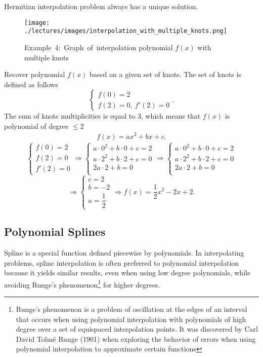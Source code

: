 \begin{proposition}{}{}
    Hermitian interpolation problem always has a unique solution.
\end{proposition}
\begin{wrapfigure}[15]{r}{0.32\columnwidth}
    \texttt{[image: ./lectures/images/interpolation\_with\_multiple\_knots.png]}
    \caption*{Example~4:~Graph~of~interpolation polynomial
    $f(x)$ with multiple knots}
\end{wrapfigure}
\Ex 
Recover polynomial $f(x)$ based on a given set of knots. The set of knots is defined as follows
$$
\left\{ 
\begin{array}{l}         
    f(0) = 2\\
    f(2) = 0, \ f'(2)=0
\end{array}
\right..
$$
The sum of knots multiplicities is equal to 3, which means that $f(x)$ is polynomial of degree $\leq 2$
\[
    \begin{array}{c}
        f(x) = ax^2 + bx + c.
    \end{array}  
\]
$$
\left\{ 
\begin{array}{l}         
    f(0) = 2\\
    f(2) = 0\\ 
    f'(2)=0
\end{array}
\right.
\Rightarrow
\left\{ 
\begin{array}{l}         
    a \cdot 0^2 + b\cdot0 + c = 2\\
    a \cdot 2^2 + b\cdot2 + c = 0\\
    2a \cdot 2 + b = 0\\
\end{array}
\right.
\Rightarrow
\left\{ 
\begin{array}{l}         
    a \cdot 0^2 + b\cdot0 + c = 2\\
    a \cdot 2^2 + b\cdot2 + c = 0\\
    2a \cdot 2 + b = 0\\
\end{array}
\right.
$$
$$
\Rightarrow
\left\{ 
\begin{array}{l}         
    c = 2\\
    b = -2\\ 
    a = \dfrac{1}{2}
\end{array}
\right.
\Longrightarrow f(x) = \dfrac{1}{2}x^2 - 2x + 2.
$$
\newpage
\subsection*{Polynomial Splines}
Spline is a special function defined piecewise by polynomials. In interpolating problems, spline interpolation is often preferred to polynomial interpolation because it yields similar results, even when using low degree polynomials, while avoiding Runge's phenomenon\footnote{Runge's phenomenon is a problem of oscillation at the edges of an interval that occurs when using polynomial interpolation with polynomials of high degree over a set of equispaced interpolation points. It was discovered by Carl David Tolmé Runge (1901) when exploring the behavior of errors when using polynomial interpolation to approximate certain functions} for higher degrees.

